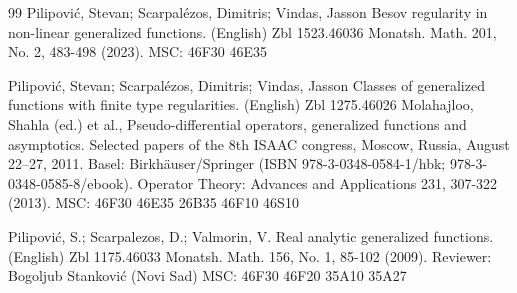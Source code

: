 \documentclass[12pt,a4paper]{amsart}
\begin{document}
\begin{thebibliography}{99}
 Pilipović, Stevan; Scarpalézos, Dimitris; Vindas, Jasson
Besov regularity in non-linear generalized functions. (English) Zbl 1523.46036 
Monatsh. Math. 201, No. 2, 483-498 (2023). 
MSC:  46F30 46E35 


Pilipović, Stevan; Scarpalézos, Dimitris; Vindas, Jasson
Classes of generalized functions with finite type regularities. (English) Zbl 1275.46026 
Molahajloo, Shahla (ed.) et al., Pseudo-differential operators, generalized functions and asymptotics. Selected papers of the 8th ISAAC congress, Moscow, Russia, August 22–27, 2011. Basel: Birkhäuser/Springer (ISBN 978-3-0348-0584-1/hbk; 978-3-0348-0585-8/ebook). Operator Theory: Advances and Applications 231, 307-322 (2013). 
MSC:  46F30 46E35 26B35 46F10 46S10 

Pilipović, S.; Scarpalezos, D.; Valmorin, V.
Real analytic generalized functions. (English) Zbl 1175.46033 
Monatsh. Math. 156, No. 1, 85-102 (2009). 
Reviewer: Bogoljub Stanković (Novi Sad)
MSC:  46F30 46F20 35A10 35A27 

\end{thebibliography}


\end{document}
